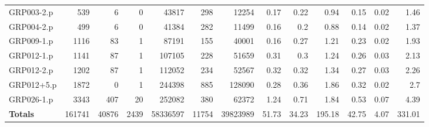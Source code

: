 \begin{table}[H]
\begin{adjustwidth}{-0.4in}{-0.5in}
\begin{tabular}{| l || r | r | r || r | r | r || r | r | r | r | r | r |}
GRP003-2.p&539&6&0&43817&298&12254&0.17&0.22&0.94&0.15&0.02&1.46\\
GRP004-2.p&499&6&0&41384&282&11499&0.16&0.2&0.88&0.14&0.02&1.37\\
GRP009-1.p&1116&83&1&87191&155&40001&0.16&0.27&1.21&0.23&0.02&1.93\\
GRP012-1.p&1141&87&1&107105&228&51659&0.31&0.3&1.24&0.26&0.03&2.13\\
GRP012-2.p&1202&87&1&112052&234&52567&0.32&0.32&1.34&0.27&0.03&2.26\\
GRP012+5.p&1872&0&1&244398&885&128090&0.28&0.36&1.86&0.32&0.02&2.7\\
GRP026-1.p&3343&407&20&252082&380&62372&1.24&0.71&1.84&0.53&0.07&4.39\\\hline \hline
\textbf{Totals}&161741&40876&2439&58336597&11754&39823989&51.73&34.23&195.18&42.75&4.07&331.01\\\hline
\end{tabular}\end{adjustwidth}\end{table}


